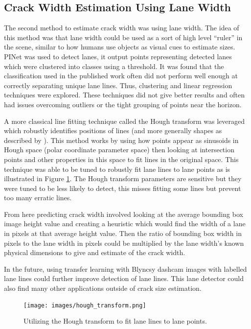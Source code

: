 \documentclass{article}
\begin{document}
\subsection{Crack Width Estimation Using Lane Width}
The second method to estimate crack width was using lane width.
The idea of this method was that lane width could be used as a sort of high level ``ruler'' in the scene, similar to how humans use objects as visual cues to estimate sizes.
PINet was used to detect lanes, it output points representing detected lanes which were clustered into classes using a threshold.
It was found that the classification used in the published work often did not perform well enough at correctly separating unique lane lines.
Thus, clustering and linear regression techniques were explored.
These techniques did not give better results and often had issues overcoming outliers or the tight grouping of points near the horizon.

A more classical line fitting technique called the Hough transform was leveraged which robustly identifies positions of lines (and more generally shapes as described by \cite{ballard1981generalizing}).
This method works by using how points appear as sinusoids in Hough space (polar coordinate parameter space) then looking at intersection points and other properties in this space to fit lines in the original space.
This technique was able to be tuned to robustly fit lane lines to lane points as is illustrated in Figure \ref{fig:hough_transform_lane_lines}.
The Hough transform parameters are sensitive but they were tuned to be less likely to detect, this misses fitting some lines but prevent too many erratic lines.

From here predicting crack width involved looking at the average bounding box image height value and creating a heuristic which would find the width of a lane in pixels at that average height value.
Then the ratio of bounding box width in pixels to the lane width in pixels could be multiplied by the lane width's known physical dimensions to give and estimate of the crack width.

In the future, using transfer learning with Blyncsy dashcam images with labelled lane lines could further improve detection of lane lines. 
This lane detector could also find many other applications outside of crack size estimation.

\begin{figure}[ht]
\begin{center}
\texttt{[image: images/hough\_transform.png]}
\end{center}
\caption{Utilizing the Hough transform to fit lane lines to lane points.}
\label{fig:hough_transform_lane_lines}
\end{figure}
\end{document}
